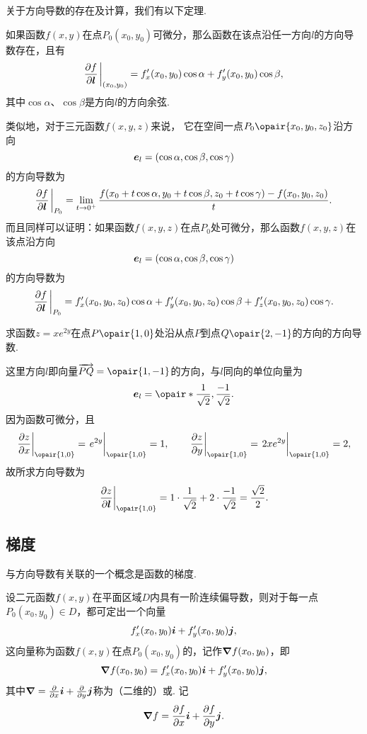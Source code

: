 关于方向导数的存在及计算，我们有以下定理.
\begin{theorem}[充分条件]
如果函数\(f(x,y)\)在点\(P_0(x_0,y_0)\)可微分，那么函数在该点沿任一方向\(l\)的方向导数存在，且有\[
\pdv{f}{\mat{l}}\eval_{(x_0,y_0)}
=f'_x(x_0,y_0) \cos\alpha + f'_y(x_0,y_0) \cos\beta,
\]其中\(\cos\alpha\)、\(\cos\beta\)是方向\(l\)的方向余弦.
\end{theorem}

类似地，对于三元函数\(f(x,y,z)\)来说，
它在空间一点\(P_0\opair{x_0,y_0,z_0}\)沿方向\[
	\boldsymbol{e}_l = (\cos\alpha,\cos\beta,\cos\gamma)
\]的方向导数为\[
	\pdv{f}{\mat{l}}\eval_{P_0}
	= \lim\limits_{t\to0^+}
	\frac{f(x_0+t\cos\alpha,y_0+t\cos\beta,z_0+t\cos\gamma)-f(x_0,y_0,z_0)}{t}.
\]
而且同样可以证明：如果函数\(f(x,y,z)\)在点\(P_0\)处可微分，那么函数\(f(x,y,z)\)在该点沿方向\[
	\boldsymbol{e}_l = (\cos\alpha,\cos\beta,\cos\gamma)
\]的方向导数为\[
\pdv{f}{\mat{l}}\eval_{P_0}
= f'_x(x_0,y_0,z_0) \cos\alpha + f'_y(x_0,y_0,z_0) \cos\beta + f'_z(x_0,y_0,z_0) \cos\gamma.
\]

\begin{example}
求函数\(z = x e^{2y}\)在点\(P\opair{1,0}\)处沿从点\(P\)到点\(Q\opair{2,-1}\)的方向的方向导数.
\begin{solution}
这里方向\(l\)即向量\(\vec{PQ} = \opair{1,-1}\)的方向，与\(l\)同向的单位向量为\[
\mat{e}_l = \opair*{\frac{1}{\sqrt{2}},\frac{-1}{\sqrt{2}}}.
\]因为函数可微分，且\[
\eval{\pdv{z}{x}}_{\opair{1,0}}
= \eval{e^{2y}}_{\opair{1,0}}
= 1,
\qquad
\eval{\pdv{z}{y}}_{\opair{1,0}}
= \eval{2xe^{2y}}_{\opair{1,0}}
= 2,
\]故所求方向导数为\[
\eval{\pdv{z}{\mat{l}}}_{\opair{1,0}}
= 1 \cdot \frac{1}{\sqrt{2}} + 2 \cdot \frac{-1}{\sqrt{2}}
= \frac{\sqrt{2}}{2}.
\]
\end{solution}
\end{example}

\subsection{梯度}
与方向导数有关联的一个概念是函数的梯度.
\begin{definition}
设二元函数\(f(x,y)\)在平面区域\(D\)内具有一阶连续偏导数，则对于每一点\(P_0(x_0,y_0) \in D\)，都可定出一个向量\[
f'_x(x_0,y_0) \boldsymbol{i} + f'_y(x_0,y_0) \boldsymbol{j},
\]这向量称为函数\(f(x,y)\)在点\(P_0(x_0,y_0)\)的，记作\(\grad{f}(x_0,y_0)\)，即\[
\grad{f}(x_0,y_0)
= f'_x(x_0,y_0) \boldsymbol{i} + f'_y(x_0,y_0) \boldsymbol{j},
\]其中\(\grad = \pdv{x} \boldsymbol{i} + \pdv{y} \boldsymbol{j}\)称为（二维的）或.
记\[
\grad{f} = \pdv{f}{x} \boldsymbol{i} + \pdv{f}{y} \boldsymbol{j}.
\]
\end{definition}

